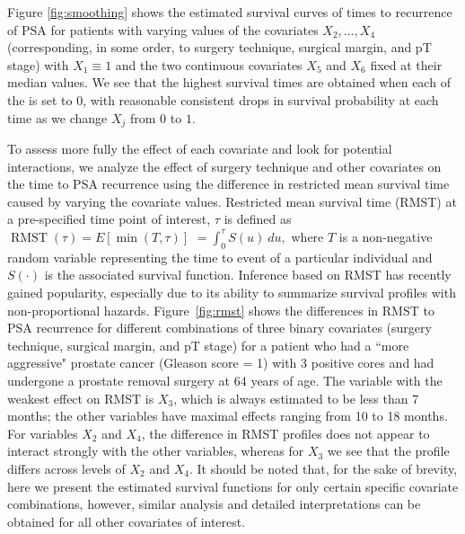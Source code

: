 \documentclass[11pt]{article}
\newcommand{\RMST}{\operatorname{RMST}}
\begin{document}
Figure \ref{fig:smoothing} shows the estimated survival curves of times to recurrence of PSA for patients with varying values of the covariates $X_2, \ldots, X_4$ (corresponding, in some order, to surgery technique, surgical margin, and pT stage) with $X_1 \equiv 1$  and the two continuous covariates $X_5$ and $X_6$ fixed at their median values. We see that the highest survival times are obtained when each of the is set to $0$, with reasonable consistent drops in survival probability at each time as we change $X_j$ from $0$ to $1$. 

To assess more fully the effect of each covariate and look for potential interactions, we analyze the effect of surgery technique and other covariates on the  time to PSA recurrence using the difference in restricted mean survival time caused by varying the covariate values. Restricted mean survival time (RMST) at a pre-specified time point of interest, $\tau$ is defined as $\RMST(\tau) = E[\min(T,\tau)]$ $= \int_{0}^{\tau}S(u) \ du,$ where $T$ is a non-negative random variable representing the time to event of a particular individual and $S(\cdot)$ is the associated survival function. Inference based on RMST has recently gained popularity, especially due to its ability to summarize survival profiles with non-proportional hazards. Figure~\ref{fig:rmst} shows the differences in RMST to PSA recurrence for different combinations of three binary covariates (surgery technique, surgical margin, and pT stage) for a patient who had a ``more aggressive" prostate cancer (Gleason score = 1) with $3$ positive cores and had undergone a prostate removal surgery at $64$ years of age. The variable with the weakest effect on RMST is $X_3$, which is always estimated to be less than 7 months; the other variables have maximal effects ranging from 10 to 18 months. For variables $X_2$ and $X_4$, the difference in RMST profiles does not appear to interact strongly with the other variables, whereas for $X_3$ we see that the profile differs across levels of $X_2$ and $X_4$. It should be noted that, for the sake of brevity, here we present the estimated survival functions for only certain specific covariate combinations, however, similar analysis and detailed interpretations can be obtained for all other covariates of interest.

\end{document}
